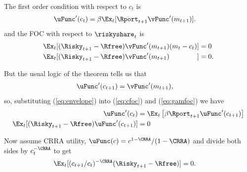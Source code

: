 \documentclass{handout}
\begin{document}
The first order condition with respect to $c_{t}$ is
\begin{equation}\begin{gathered}\begin{aligned}
        \uFunc^{\prime}(c_{t}) & =  \beta \Ex_{t}[ \Rport_{t+1}\vFunc^{\prime}({m}_{t+1})] \label{eq:cfoc}.
\end{aligned}\end{gathered}\end{equation}
and the FOC with respect to $\riskyshare_{t}$ is
\begin{equation}\begin{gathered}\begin{aligned}
        \Ex_{t}[(\Risky_{t+1}-\Rfree)\vFunc^{\prime}({m}_{t+1})({m}_{t}-{c}_{t})] & =  0 
\\      \Ex_{t}[(\Risky_{t+1}-\Rfree)\vFunc^{\prime}({m}_{t+1})\phantom{({m}_{t}-{c}_{t})}] & =  0 \label{eq:gamfoc}
.
\end{aligned}\end{gathered}\end{equation}

But the usual logic of the  theorem tells us that 
\begin{equation}\begin{gathered}\begin{aligned}
        \uFunc^{\prime}(c_{t+1}) & =  \vFunc^{\prime}(m_{t+1}), \label{eq:envelope}
\end{aligned}\end{gathered}\end{equation}
so, substituting (\ref{eq:envelope}) into (\ref{eq:cfoc}) and (\ref{eq:gamfoc}) we have
\begin{equation}\begin{gathered}\begin{aligned}
        \uFunc^{\prime}(c_{t}) & =  \Ex_{t}\left[\beta  \Rport_{t+1} \uFunc^{\prime}({c}_{t+1})\right] \label{eq:ceuler}
\\      \Ex_{t}[(\Risky_{t+1}-\Rfree)\uFunc^{\prime}({c}_{t+1})] & =  0 %
\end{aligned}\end{gathered}\end{equation}

Now assume CRRA utility, $\uFunc(c) = c^{1-\CRRA}/(1-\CRRA)$ and divide both 
sides by $c_{t}^{-\CRRA}$ to get
\begin{equation}\begin{gathered}\begin{aligned}
        \Ex_{t}[(c_{t+1}/c_{t})^{-\CRRA}(\Risky_{t+1}-\Rfree)] & =  0. \label{eq:gameulernew}
\end{aligned}\end{gathered}\end{equation}
\end{document}
